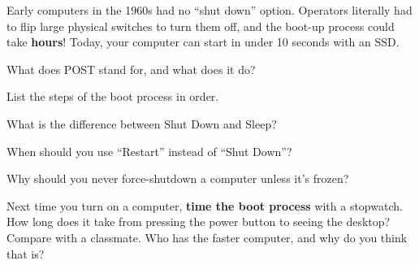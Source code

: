 
\begin{funfact}
Early computers in the 1960s had no ``shut down'' option. Operators literally had to flip large physical switches to turn them off, and the boot-up process could take \textbf{hours}! Today, your computer can start in under 10 seconds with an SSD.
\end{funfact}

\begin{reviewqs}
  \item What does POST stand for, and what does it do?
  \item List the steps of the boot process in order.
  \item What is the difference between Shut Down and Sleep?
  \item When should you use ``Restart'' instead of ``Shut Down''?
  \item Why should you never force-shutdown a computer unless it's frozen?
\end{reviewqs}

\begin{challenge}
Next time you turn on a computer, \textbf{time the boot process} with a stopwatch. How long does it take from pressing the power button to seeing the desktop? Compare with a classmate. Who has the faster computer, and why do you think that is?
\end{challenge}
